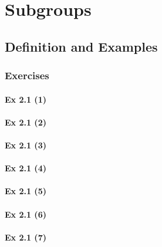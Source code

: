 \setcounter{chapter}{0}
\renewcommand{\thechapter}{2}
\chapter{Subgroups}\label{ch:2}
\setcounter{equation}{0}	        %

\section{Definition and Examples}\label{sec:2.1}	
\subsection*{Exercises}\label{sec:2.1_Exercises}

\subsubsection{Ex 2.1 (1)}\label{sec:Ex_2.1.1}

\subsubsection{Ex 2.1 (2)}\label{sec:Ex_2.1.2}

\subsubsection{Ex 2.1 (3)}\label{sec:Ex_2.1.3}

\subsubsection{Ex 2.1 (4)}\label{sec:Ex_2.1.4}

\subsubsection{Ex 2.1 (5)}\label{sec:Ex_2.1.5}

\subsubsection{Ex 2.1 (6)}\label{sec:Ex_2.1.6}

\subsubsection{Ex 2.1 (7)}\label{sec:Ex_2.1.7}

